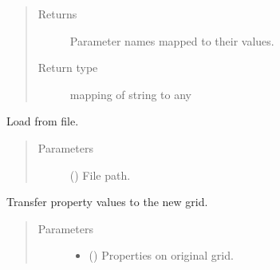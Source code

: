 \documentclass[letterpaper,10pt,english]{sphinxmanual}
\begin{document}
\begin{fulllineitems}
\begin{fulllineitems}
\begin{quote}
\begin{description}
\item[{Returns}] \leavevmode
{} \textendash{} Parameter names mapped to their values.

\item[{Return type}] \leavevmode
mapping of string to any

\end{description}\end{quote}

\end{fulllineitems}


\begin{fulllineitems}
\label{\detokenize{api/properties_transfer:geology.models.PropertiesTransfer.load}}
Load from file.
\begin{quote}\begin{description}
\item[{Parameters}] \leavevmode
{} () \textendash{} File path.

\end{description}\end{quote}

\end{fulllineitems}


\begin{fulllineitems}
\label{\detokenize{api/properties_transfer:geology.models.PropertiesTransfer.predict}}
Transfer property values to the new grid.
\begin{quote}\begin{description}
\item[{Parameters}] \leavevmode\begin{itemize}
\item {} 
 () \textendash{} Properties on original grid.


\end{itemize}
\end{description}
\end{quote}
\end{fulllineitems}
\end{fulllineitems}
\end{document}
